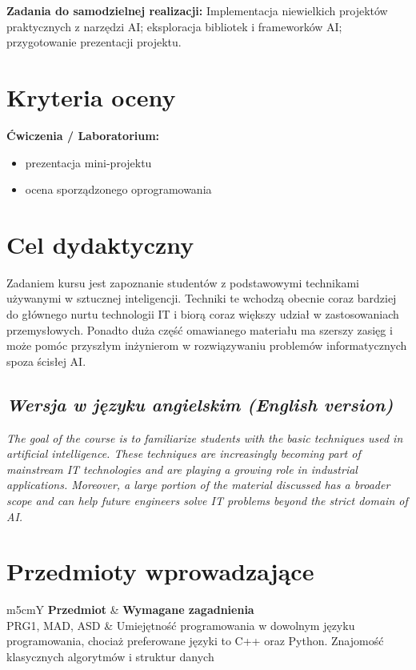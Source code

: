 \documentclass[12pt, a4paper]{article}
\newcommand{\thdrule}{\noalign{\global\setlength{\extrarowheight}{0pt}}}
\newcommand{\thdend}{\noalign{\global\setlength{\extrarowheight}{3pt}}}
\begin{document}
\vspace{4pt}
\noindent\textbf{Zadania do samodzielnej realizacji:} Implementacja niewielkich projektów praktycznych z narzędzi AI; eksploracja bibliotek i frameworków AI; przygotowanie prezentacji projektu.

\section{Kryteria oceny}

\textbf{Ćwiczenia / Laboratorium:}
\begin{itemize}
  \item prezentacja mini-projektu
  \item ocena sporządzonego oprogramowania
\end{itemize}


\section{Cel dydaktyczny}

Zadaniem kursu jest zapoznanie studentów z podstawowymi technikami używanymi w sztucznej inteligencji. Techniki te wchodzą obecnie coraz bardziej do głównego nurtu technologii IT i biorą coraz większy udział w zastosowaniach przemysłowych. Ponadto duża część omawianego materiału ma szerszy zasięg i może pomóc przyszłym inżynierom w rozwiązywaniu problemów informatycznych spoza ścisłej AI.

\subsection*{\textit{Wersja w języku angielskim (English version)}}

\textit{The goal of the course is to familiarize students with the basic techniques used in artificial intelligence. These techniques are increasingly becoming part of mainstream IT technologies and are playing a growing role in industrial applications. Moreover, a large portion of the material discussed has a broader scope and can help future engineers solve IT problems beyond the strict domain of AI.}


\section{Przedmioty wprowadzające}

{\scriptsize
\begin{tabularx}{\textwidth}{m{5cm}Y}
\thdrule\toprule
{} {\color{white}\textbf{Przedmiot}} & {\color{white}\textbf{Wymagane zagadnienia}} \\
\midrule\thdend
   PRG1, MAD, ASD & Umiejętność programowania w dowolnym języku programowania, chociaż preferowane języki to C++ oraz Python. Znajomość klasycznych algorytmów i struktur danych \\
\bottomrule
\end{tabularx}}
\end{document}
